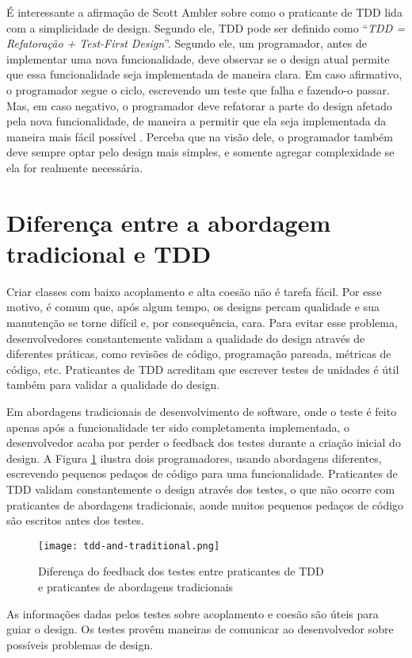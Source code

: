 É interessante a afirmação de Scott Ambler sobre como o praticante de TDD lida
com a simplicidade de design. Segundo ele, TDD pode ser definido como
``\textit{TDD = Refatoração + Test-First Design}''. Segundo ele, um programador,
antes de implementar uma nova funcionalidade, deve observar se o design atual
permite que essa funcionalidade seja implementada de maneira clara. Em caso
afirmativo, o programador segue o ciclo, escrevendo um teste que falha e
fazendo-o passar. Mas, em caso negativo, o programador deve refatorar a parte do
design afetado pela nova funcionalidade, de maneira a permitir que ela seja
implementada da maneira mais fácil possível \cite{wambler-tdd}. Perceba que na
visão dele, o programador também deve sempre optar pelo design mais simples, e
somente agregar complexidade se ela for realmente necessária.

\section{Diferença entre a abordagem tradicional e TDD}
\label{sec:diferencas-tdd-e-tradicional}

Criar classes com baixo acoplamento e alta coesão não é tarefa fácil. Por esse
motivo, é comum que, após algum tempo, os designs percam qualidade e sua
manutenção se torne difícil e, por consequência, cara.
Para evitar esse problema, desenvolvedores constantemente validam a qualidade do
design através de diferentes práticas, como revisões de código, programação
pareada, métricas de código, etc. Praticantes de TDD acreditam que escrever
testes de unidades é útil também para validar a qualidade do design.

Em abordagens tradicionais de desenvolvimento de software, onde o teste é feito
apenas após a funcionalidade ter sido completamenta implementada, o
desenvolvedor acaba por perder o feedback dos testes durante a criação inicial
do design. A Figura \ref{fig:tdd-feedback} ilustra dois programadores, usando
abordagens diferentes, escrevendo pequenos pedaços de código para uma
funcionalidade. Praticantes de TDD validam constantemente o design através dos
testes, o que não ocorre com praticantes de abordagens tradicionais, aonde
muitos pequenos pedaços de código são escritos antes dos testes.

\begin{figure}[h!H]
  \centering
  \texttt{[image: tdd-and-traditional.png]}
  \caption{Diferença do feedback dos testes entre praticantes de TDD 
  \\e praticantes de abordagens tradicionais}
  \label{fig:tdd-feedback}
\end{figure}

As informações dadas pelos testes sobre acoplamento e coesão são úteis para
guiar o design. Os testes provêm maneiras de comunicar ao desenvolvedor sobre
possíveis problemas de design. 
